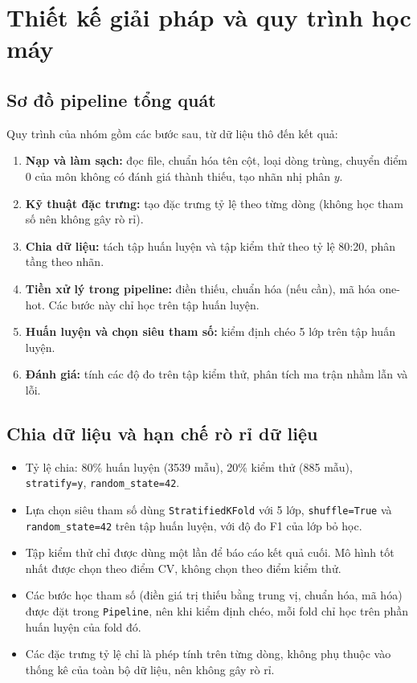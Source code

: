 \documentclass[12pt,a4paper]{article}
\begin{document}
\section{Thiết kế giải pháp và quy trình học máy}

\subsection{Sơ đồ pipeline tổng quát}
Quy trình của nhóm gồm các bước sau, từ dữ liệu thô đến kết quả:
\begin{enumerate}
  \item \textbf{Nạp và làm sạch:} đọc file, chuẩn hóa tên cột, loại dòng trùng, chuyển điểm 0 của môn không có đánh giá thành thiếu, tạo nhãn nhị phân $y$.
  \item \textbf{Kỹ thuật đặc trưng:} tạo đặc trưng tỷ lệ theo từng dòng (không học tham số nên không gây rò rỉ).
  \item \textbf{Chia dữ liệu:} tách tập huấn luyện và tập kiểm thử theo tỷ lệ 80:20, phân tầng theo nhãn.
  \item \textbf{Tiền xử lý trong pipeline:} điền thiếu, chuẩn hóa (nếu cần), mã hóa one-hot. Các bước này chỉ học trên tập huấn luyện.
  \item \textbf{Huấn luyện và chọn siêu tham số:} kiểm định chéo 5 lớp trên tập huấn luyện.
  \item \textbf{Đánh giá:} tính các độ đo trên tập kiểm thử, phân tích ma trận nhầm lẫn và lỗi.
\end{enumerate}

\subsection{Chia dữ liệu và hạn chế rò rỉ dữ liệu}
\begin{itemize}
  \item Tỷ lệ chia: 80\% huấn luyện (3539 mẫu), 20\% kiểm thử (885 mẫu), \texttt{stratify=y}, \texttt{random\_state=42}.
  \item Lựa chọn siêu tham số dùng \texttt{StratifiedKFold} với 5 lớp, \texttt{shuffle=True} và \texttt{random\_state=42} trên tập huấn luyện, với độ đo F1 của lớp bỏ học.
  \item Tập kiểm thử chỉ được dùng một lần để báo cáo kết quả cuối. Mô hình tốt nhất được chọn theo điểm CV, không chọn theo điểm kiểm thử.
  \item Các bước học tham số (điền giá trị thiếu bằng trung vị, chuẩn hóa, mã hóa) được đặt trong \texttt{Pipeline}, nên khi kiểm định chéo, mỗi fold chỉ học trên phần huấn luyện của fold đó.
  \item Các đặc trưng tỷ lệ chỉ là phép tính trên từng dòng, không phụ thuộc vào thống kê của toàn bộ dữ liệu, nên không gây rò rỉ.
\end{itemize}
\end{document}
